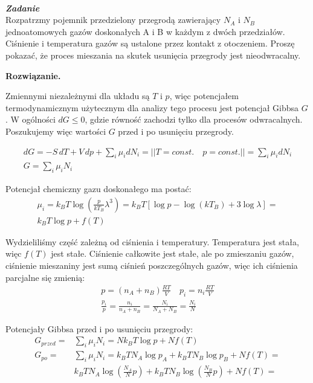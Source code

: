 \documentclass[11pt,a4paper]{article}
\newcounter{zadanie}\newcommand{\zadanie}[1][]{\addtocounter{zadanie}{1} ~\\ {\bf \emph{Zadanie \arabic{zadanie} #1 }} \\}
\newenvironment{solution}{\vspace{1cm} \par\textbf{Rozwiązanie.} \vspace{1cm}}{}
\begin{document}
\zadanie[]

Rozpatrzmy pojemnik przedzielony przegrodą  zawierający
$N_{A}$ i $N_{B}$ jednoatomowych gazów doskonałych A i B w każdym z dwóch przedziałów. 
Ciśnienie i temperatura gazów są ustalone przez kontakt z otoczeniem. 
Proszę pokazać, że proces mieszania na skutek usunięcia przegrody jest 
nieodwracalny.

\begin{solution}

Zmiennymi niezależnymi dla układu są $T$ i $p$, więc potencjałem termodynamicznym 
użytecznym dla analizy tego procesu jest potencjał Gibbsa $G$. 
W ogólności $dG \le 0$, gdzie równość zachodzi tylko dla procesów odwracalnych.
Poszukujemy więc wartości $G$ przed i po usunięciu przegrody.

\begin{align*}
  dG = -S\,dT + V\,dp + \sum_i \mu_i dN_i = || T=const.\quad p=const. || = \sum_i \mu_i dN_i \\
  G = \sum_i \mu_i N_i
\end{align*}

Potencjał chemiczny gazu doskonałego ma postać:
\begin{align*}
  \mu_i = k_BT \log( \frac{p}{kT_B} \lambda^3 ) = 
          k_BT \left[\log p  - \log(kT_B) + 3\log\lambda \right] = \\
          k_BT \log p + f(T)       
\end{align*} 

Wydzieliliśmy część zależną od ciśnienia i temperatury.
Temperatura jest stała, więc $f(T)$ jest stałe. 
Ciśnienie całkowite jest stałe, ale po zmieszaniu gazów, 
ciśnienie mieszaniny jest sumą ciśnień poszczególnych gazów, 
więc ich ciśnienia parcjalne się zmienią:
\begin{align*}
  p = (n_A+n_B)\frac{RT}{V} \quad p_{i} = n_i\frac{RT}{V} \\
  \frac{p_{i}}{p} = \frac{n_i}{n_A + n_B} = \frac{N_i}{N_A + N_B} = \frac{N_{i}}{N}
\end{align*}

Potencjały Gibbsa przed i po usunięciu przegrody:
\begin{align*}
  G_{przed}=& \sum_i \mu_i N_i = Nk_BT \log p  + Nf(T) \\ 
  G_{po} =& \sum_i \mu_i N_i = k_BTN_A \log p_A + k_BT N_B\log p_B + Nf(T) = \\
  & k_BT N_A \log\left( \frac{N_{A}}{N}p\right) + 
    k_BT N_B\log\left( \frac{N_{B}}{N}p \right) + Nf(T) = \\
\end{align*}


\end{solution}
\end{document}
